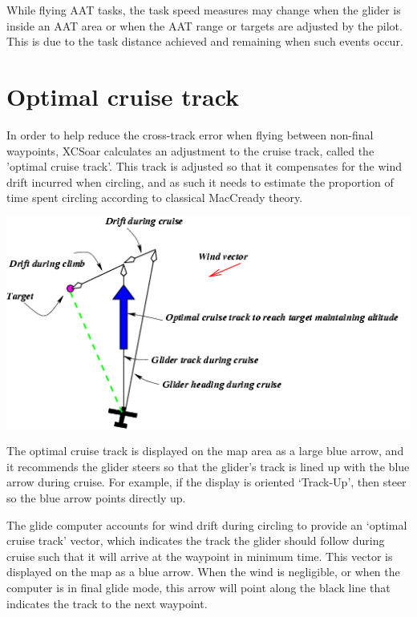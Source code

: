 \documentclass[a4paper,12pt]{refrep}
\begin{document}
While flying AAT tasks, the task speed measures may change when the
glider is inside an AAT area or when the AAT range or targets are
adjusted by the pilot.  This is due to the task distance achieved and
remaining when such events occur.


\section{Optimal cruise track}

In order to help reduce the cross-track error when flying between
non-final waypoints, XCSoar calculates an adjustment to the cruise
track, called the 'optimal cruise track'.  This track is adjusted so
that it compensates for the wind drift incurred when circling, and as
such it needs to estimate the proportion of time spent circling
according to classical MacCready theory.

\begin{center}
\begin{maxipage}
\includegraphics[angle=0,width=0.8\linewidth,keepaspectratio='true']{figures/fig-optcruise.png}
\end{maxipage}
\end{center}

The optimal cruise track is displayed on the map area as a large blue
arrow, and it recommends the glider steers so that the glider's track
is lined up with the blue arrow during cruise.  For example, if the
display is oriented `Track-Up', then steer so the blue arrow points
directly up.

The glide computer accounts for wind drift during circling to provide
an `optimal cruise track' vector, which indicates the track the glider
should follow during cruise such that it will arrive at the waypoint
in minimum time.  This vector is displayed on the map as a blue arrow.
When the wind is negligible, or when the computer is in final glide
mode, this arrow will point along the black line that indicates the
track to the next waypoint.
\end{document}
